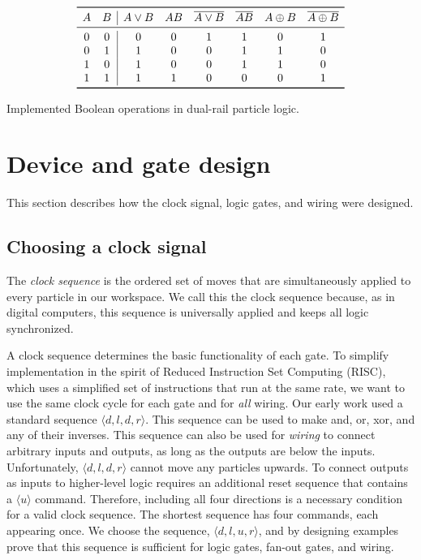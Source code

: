 \documentclass[letterpaper, 10 pt, conference]{ieeeconf}
\begin{document}
\begin{table}
\begin{displaymath}
\begin{array}{cc|cccccc}
\toprule
   A & B & A\lor{}B & AB & \overline{A\lor{}B} & \overline{AB} & A\oplus B & \overline{A\oplus B} \\
\midrule
0 & 0 & 0 & 0 & 1 & 1 & 0 & 1 \\
0 & 1 & 1 & 0 & 0 & 1 & 1 & 0 \\
1 & 0 & 1 & 0 & 0 & 1 & 1 & 0 \\
1 & 1 & 1 & 1 & 0 & 0 & 0 & 1 \\
\bottomrule
\end{array}
\end{displaymath}
  \caption{Implemented Boolean operations in dual-rail particle logic.}
  \label{tab:dualRailParticleLogic}
\end{table}

\section{Device and gate design}\label{sec:Design}
This section describes how the clock signal, logic gates, and wiring were designed.
\subsection{Choosing a clock signal}

The \emph{clock sequence} is the ordered set of moves that are simultaneously applied to every particle in our workspace. We call this the clock sequence because, as in digital computers, this sequence is universally applied and keeps all logic synchronized.

A clock sequence determines the basic functionality of each gate.  To simplify implementation in the spirit of Reduced Instruction Set Computing (RISC), which uses a simplified set of instructions that run at the same rate, we want to use the same clock cycle for each gate and for \emph{all} wiring. 
Our early work used a standard sequence  $\langle d,l,d,r \rangle$.  This sequence can be used to make {\sc and, or, xor}, and any of their inverses.  This sequence can also be used for \emph{wiring} to connect arbitrary inputs and outputs, as long as the outputs are below the inputs.  Unfortunately, $\langle d,l,d,r \rangle$ cannot move any particles upwards. To connect outputs as inputs to higher-level logic requires an additional reset sequence that contains a $\langle u \rangle$ command.  Therefore, including all four directions is a necessary condition for a valid clock sequence.  The shortest sequence has four commands, each appearing once. We choose the sequence, $\langle d,l,u,r \rangle$, and by designing examples prove that this sequence is sufficient for logic gates, {\sc fan-out} gates, and wiring.
\end{document}
